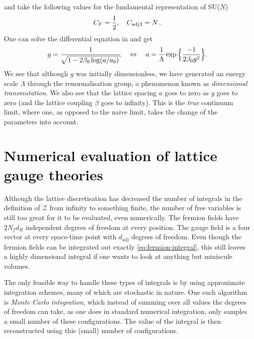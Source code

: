 %
and take the following values for the fundamental representation of SU($N$)
%
\begin{equation}
  C_F = \frac{1}{2}, \hskip1em C_{\text{adj}\hskip.2ex 2} = N \,.
\end{equation}
%
One can solve the differential equation in  and get
%
\begin{equation} \label{eq:running-coupling}
  g = \frac{1}{\sqrt{1 - 2\beta_0 \log (a/a_0)}}
    \hskip1em\Leftrightarrow\hskip1em
    a = \frac{1}{\Lambda} \exp\Big\{\frac{-1}{2\beta_0 g^2}\Big\} .
\end{equation}
%
We see that although $g$ was initially dimensionless, we have generated an
energy scale $\Lambda$ through the renormalisation group, a phenomenon known as
\emph{dimensional transmutation}. We also see that the lattice spacing $a$ goes
to zero as $g$ goes to zero (and the lattice coupling $\beta$ goes to infinity).
This is the \emph{true} continuum limit, where one, as opposed to the naive
limit, takes the change of the parameters into account.

\section{Numerical evaluation of lattice gauge theories}
\label{sec:numerical_eval}

Although the lattice discretisation has decreased the number of integrals in the
definition of $\mathcal{Z}$ from infinity to something finite, the number of free
variables is still too great for it to be evaluated, even numerically. The
fermion fields have $2 N_f d_R$ independent degrees of freedom at every
position. The gauge field is a four vector at every space-time point with
$d_{\text{adj}}$ degrees of freedom. Even though the fermion fields can be
integrated out exactly \eqref{eq:fermion-integral}, this still leaves a highly
dimensional integral if one wants to look at anything but miniscule volumes.

The only feasible way to handle these types of integrals is by using approximate
integration schemes, many of which are stochastic in nature. One such algorithm
is \emph{Monte Carlo integration}, which instead of summing over all
values the degrees of freedom can take, as one does in standard numerical
integration, only samples a small number of these configurations. The value of
the integral is then reconstructed using this (small) number of configurations.

